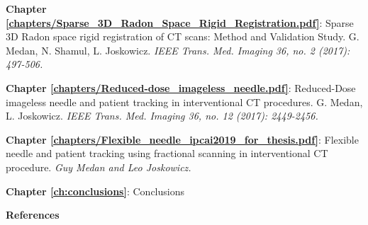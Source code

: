 \textbf{Chapter \ref{chapters/Sparse_3D_Radon_Space_Rigid_Registration.pdf}}: Sparse 3D Radon space rigid registration of CT scans: Method and Validation Study.
G. Medan, N. Shamul, L. Joskowicz. \textit{IEEE Trans. Med. Imaging 36, no. 2 (2017): 497-506.}

\textbf{Chapter \ref{chapters/Reduced-dose_imageless_needle.pdf}}: Reduced-Dose imageless needle and patient tracking in interventional CT procedures.
G. Medan, L. Joskowicz. \textit{IEEE Trans. Med. Imaging 36, no. 12 (2017): 2449-2456.}

\textbf{Chapter \ref{chapters/Flexible_needle_ipcai2019_for_thesis.pdf}}: Flexible needle and patient tracking using fractional scanning in interventional CT procedure. \textit{Guy Medan and Leo Joskowicz.}

\textbf{Chapter \ref{ch:conclusions}}: Conclusions

\textbf{References}